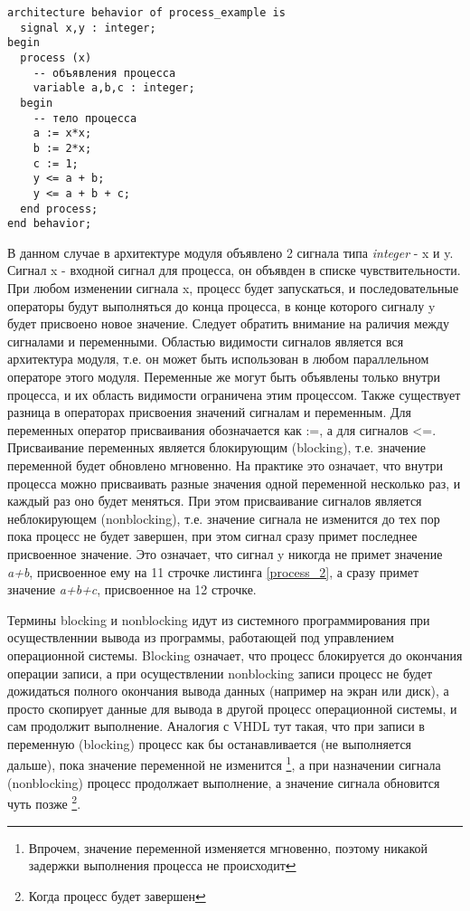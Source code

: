 \begin{Code}
\begin{lstlisting}[caption=Процесс с внутренними переменными и списком чувствительности, label=process_2]
architecture behavior of process_example is
  signal x,y : integer;
begin
  process (x)
    -- объявления процесса
    variable a,b,c : integer;
  begin
    -- тело процесса
    a := x*x;
    b := 2*x;
    c := 1;
    y <= a + b;
    y <= a + b + c;
  end process;
end behavior;
\end{lstlisting}
\end{Code}

В данном случае в архитектуре модуля объявлено 2 сигнала типа \emph{integer} - x и y. Сигнал x - входной сигнал для процесса, он объявден в списке чувствительности. При любом изменении сигнала x, процесс будет запускаться, и последовательные операторы будут выполняться до конца процесса, в конце которого сигналу y будет присвоено новое значение. Следует обратить внимание на раличия между сигналами и переменными. Областью видимости сигналов является вся архитектура модуля, т.е. он может быть использован в любом параллельном операторе этого модуля. Переменные же могут быть объявлены только внутри процесса, и их область видимости ограничена этим процессом. Также существует разница в операторах присвоения значений сигналам и переменным. Для переменных оператор присваивания обозначается как :=, а для сигналов <=. Присваивание переменных является блокирующим (blocking), т.е. значение переменной будет обновлено мгновенно. На практике это означает, что внутри процесса можно присваивать разные значения одной переменной несколько раз, и каждый раз оно будет меняться. При этом присваивание сигналов является неблокирующем (nonblocking), т.е. значение сигнала не изменится до тех пор пока процесс не будет завершен, при этом сигнал сразу примет последнее присвоенное значение. Это означает, что сигнал y никогда не примет значение \emph{a+b}, присвоенное ему на 11 строчке листинга \ref{process_2}, а сразу примет значение \emph{a+b+c}, присвоенное на 12 строчке.

Термины blocking и nonblocking идут из системного программирования при осуществленнии вывода из программы, работающей под управлением операционной системы. Blocking означает, что процесс блокируется до окончания операции записи, а при осуществлении nonblocking записи процесс не будет дожидаться полного окончания вывода данных (например на экран или диск), а просто скопирует данные для вывода в другой процесс операционной системы, и сам продолжит выполнение. Аналогия с VHDL тут такая, что при записи в переменную (blocking) процесс как бы останавливается (не выполняется дальше), пока значение переменной не изменится \footnote{Впрочем, значение переменной изменяется мгновенно, поэтому никакой задержки выполнения процесса не происходит}, а при назначении сигнала (nonblocking) процесс продолжает выполнение, а значение сигнала обновится чуть позже \footnote{Когда процесс будет завершен}.

